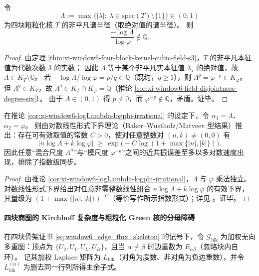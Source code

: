 \begin{corollary}\label{cor:xi-window6-logLambda-logphi-irrational}
令
\[
\Lambda:=\max\{|\lambda|:\ \lambda\in\mathrm{spec}(T)\setminus\{1\}\}\in(0,1)
\]
为四块粗粒化核 \(T\) 的非平凡谱半径（取绝对值的谱半径）。
则
\[
\frac{-\log\Lambda}{\log\varphi}\notin\mathbb Q.
\]
\end{corollary}

\begin{proof}
由定理 \ref{thm:xi-window6-four-block-kernel-cubic-field-s3}，\(T\) 的非平凡本征值为代数次数 \(3\) 的实数；
因此 \(\Lambda\) 等于某个非平凡实本征值 \(\lambda_\star\) 的绝对值，故 \(\Lambda\in K_T\setminus\mathbb Q\)。
若 \(-\log\Lambda/\log\varphi=p/q\in\mathbb Q\)（既约，\(q\ge 1\)），则
\(
\Lambda^q=\varphi^{-p}\in K_\varphi
\)。
但 \(\Lambda^q\in K_T\)，故 \(\Lambda^q\in K_T\cap K_\varphi=\mathbb Q\)（推论 \ref{cor:xi-window6-field-disjointness-degree-six}）。
由于 \(\Lambda\in(0,1)\) 得 \(p\neq 0\)，而 \(\varphi^{-p}\notin\mathbb Q\)，矛盾。证毕。
\end{proof}

\begin{proposition}\label{prop:xi-window6-baker-effective-beat-bound}
在推论 \ref{cor:xi-window6-logLambda-logphi-irrational} 的设定下，令 \(\alpha_1=\Lambda\)、\(\alpha_2=\varphi\)。
则由对数线性形式下界理论（Baker--W\"ustholz/Matveev 型结果）推出：存在可有效取值的常数 \(C>0\)，使对任意整数对 \((n,k)\neq(0,0)\) 有
\[
\bigl|n\log\Lambda+k\log\varphi\bigr|
\ \ge\
\exp\!\bigl(-C\log(1+\max\{|n|,|k|\})\bigr).
\]
因此任意“混合尺度 \(\Lambda^n\)”与“模尺度 \(\varphi^{-k}\)”之间的近共振误差至多以多对数速度出现，排除了指数级同步。
\end{proposition}

\begin{proof}
由推论 \ref{cor:xi-window6-logLambda-logphi-irrational}，\(\Lambda\) 与 \(\varphi\) 乘法独立。
对数线性形式下界给出对任意非零整数线性组合 \(n\log\Lambda+k\log\varphi\) 的有效下界，其量级为 \((1+\max\{|n|,|k|\})^{-C}\)（等价写作所示指数形式）；详见 \cite{BakerWustholz2007LogarithmicForms,Matveev2000LinearFormsLogs}。证毕。
\end{proof}

\paragraph{四块商图的 Kirchhoff 复杂度与粗粒化 Green 核的分母障碍}
在四块骨架证书 \eqref{eq:window6_edge_flux_skeleton} 的记号下，令 \(\mathcal{G}_{\mathrm{blk}}\) 为加权无向多重图：顶点为 \(\{U_2,U_1,U_L,U_R\}\)，且当 \(\alpha\neq\beta\) 时边重数为 \(E_{\alpha\beta}\)（忽略块内自环）。
记其加权 Laplace 矩阵为 \(L_{\mathrm{blk}}\)（对角为度数、非对角为负边重数），并令 \(L_{\mathrm{blk}}^{(\alpha)}\) 为删去同一行列所得主余子式。

